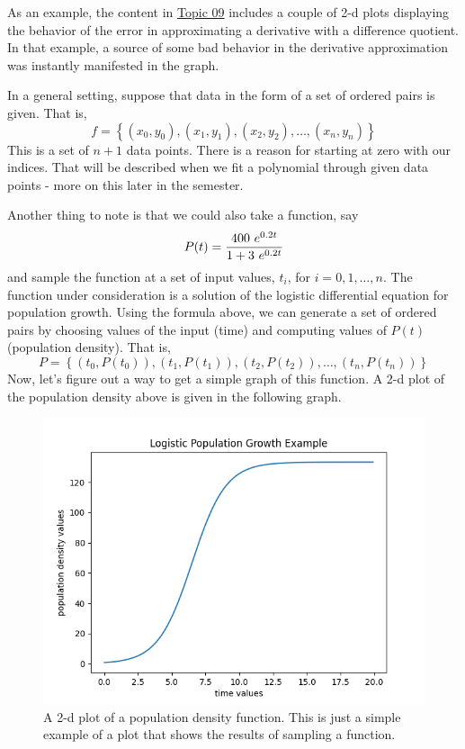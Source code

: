 \documentclass[10pt,fleqn]{article}
\begin{document}
As an example, the content in \href{../../topic_09/html/topic_09.html}{Topic 09}
includes a couple of 2-d plots displaying the behavior of the error in
approximating a derivative with a difference quotient. In that example, a source
of some bad behavior in the derivative approximation was instantly manifested in
the graph. 

In a general setting, suppose that data in the form of a set of ordered pairs is
given. That is,
\[
  f = \left\lbrace 
       (x_0, y_0), (x_1, y_1), (x_2, y_2), \ldots, (x_n, y_n)
      \right\rbrace 
\]
This is a set of \(n+1\) data points. There is a reason for starting at zero
with our indices. That will be described when we fit a polynomial through given
data points - more on this later in the semester.

Another thing to note is that we could also take a function, say
\[
   P(t) = {{400\ e^{0.2 t}}\over{1 + 3\ e^{0.2 t}}}
\]
and sample the function at a set of input values, \(t_i\), for
\(i=0,1,\ldots,n\). The function under consideration is a solution of the
logistic differential equation for population growth. Using the formula above,
we can generate a set of ordered pairs by choosing values of the input (time)
and computing values of $P(t)$ (population density). That is,
\[
  P = \left\lbrace 
       (t_0, P(t_0)), (t_1, P(t_1)), (t_2, P(t_2)), \ldots, (t_n, P(t_n))
      \right\rbrace 
\]
Now, let's figure out a way to get a simple graph of this function. A 2-d plot
of the population density above is given in the following graph.
\vfill
\begin{figure}[h]
\centering
\includegraphics[width=6.0in]{../images/2dplot_01.png}
\vskip0.1in
\caption{A 2-d plot of a population density function. This is just a simple
         example of a plot that shows the results of sampling a function.}
\end{figure}
\end{document}
